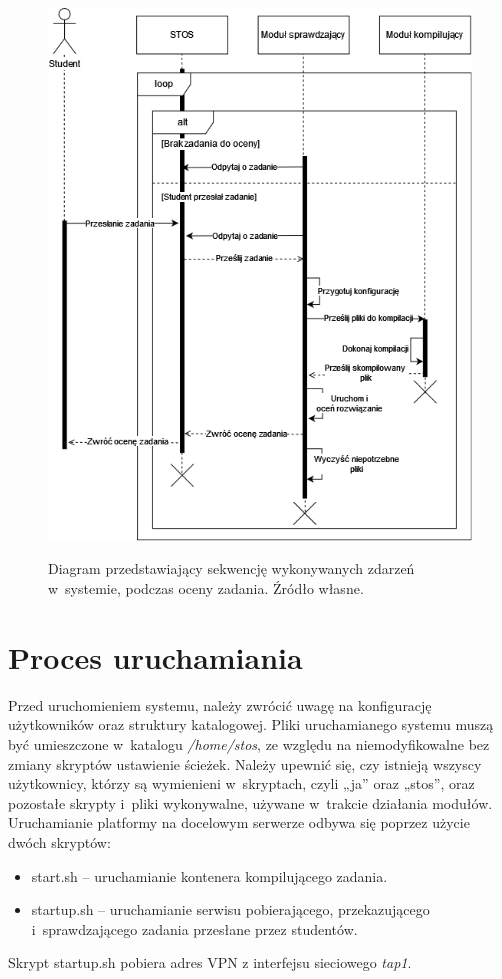 \begin{figure}
	\begin{center}
		\resizebox{1.0\textwidth}{!} {
			\includegraphics{img/1/d_sek_1.png}
		}
		\caption[Diagram sekwencji komponentów]{Diagram przedstawiający sekwencję wykonywanych zdarzeń w~systemie, podczas oceny zadania. Źródło własne.}
	\end{center}
\end{figure}

\section{Proces uruchamiania}
Przed uruchomieniem systemu, należy zwrócić uwagę na konfigurację użytkowników oraz struktury katalogowej. Pliki uruchamianego systemu muszą być umieszczone w~katalogu \textit{/home/stos}, ze względu na niemodyfikowalne bez zmiany skryptów ustawienie ścieżek. Należy upewnić się, czy istnieją wszyscy użytkownicy, którzy są wymienieni w~skryptach, czyli „ja” oraz „stos”, oraz pozostałe skrypty i~pliki wykonywalne, używane w~trakcie działania modułów.
\newline \indent Uruchamianie platformy na docelowym serwerze odbywa się poprzez użycie dwóch skryptów:
\begin{itemize}
    \item start.sh -- uruchamianie kontenera kompilującego zadania.
    \item startup.sh -- uruchamianie serwisu pobierającego, przekazującego i~sprawdzającego zadania przesłane przez studentów.
\end{itemize}
Skrypt startup.sh pobiera adres VPN z interfejsu sieciowego \textit{tap1}. 


